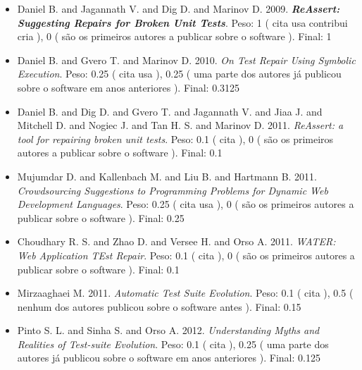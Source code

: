 \begin{itemize}
\item Daniel B. and Jagannath V. and Dig D. and Marinov D.
      2009.
        \textbf{\textit{ ReAssert: Suggesting Repairs for Broken Unit Tests}}.
      Peso:
      1 (
          cita
          usa
          contribui
          cria
      ),
      0 (
são os primeiros autores a publicar sobre o software
      ).
      Final:
      1

\item Daniel B. and Gvero T. and Marinov D.
      2010.
        \textit{ On Test Repair Using Symbolic Execution}.
      Peso:
      0.25 (
          cita
          usa
      ),
      0.25 (
uma parte dos autores já publicou sobre o software em anos anteriores
      ).
      Final:
      0.3125

\item Daniel B. and Dig D. and Gvero T. and Jagannath V. and Jiaa J. and Mitchell D. and Nogiec J. and Tan H. S. and Marinov D.
      2011.
        \textit{ ReAssert: a tool for repairing broken unit tests}.
      Peso:
      0.1 (
          cita
      ),
      0 (
são os primeiros autores a publicar sobre o software
      ).
      Final:
      0.1

\item Mujumdar D. and Kallenbach M. and Liu B. and Hartmann B.
      2011.
        \textit{ Crowdsourcing Suggestions to Programming Problems for Dynamic Web Development Languages}.
      Peso:
      0.25 (
          cita
          usa
      ),
      0 (
são os primeiros autores a publicar sobre o software
      ).
      Final:
      0.25

\item Choudhary R. S. and Zhao D. and Versee H. and Orso A.
      2011.
        \textit{ WATER: Web Application TEst Repair}.
      Peso:
      0.1 (
          cita
      ),
      0 (
são os primeiros autores a publicar sobre o software
      ).
      Final:
      0.1

\item Mirzaaghaei M.
      2011.
        \textit{ Automatic Test Suite Evolution}.
      Peso:
      0.1 (
          cita
      ),
      0.5 (
nenhum dos autores publicou sobre o software antes
      ).
      Final:
      0.15

\item Pinto S. L. and Sinha S. and Orso A.
      2012.
        \textit{ Understanding Myths and Realities of Test-suite Evolution}.
      Peso:
      0.1 (
          cita
      ),
      0.25 (
uma parte dos autores já publicou sobre o software em anos anteriores
      ).
      Final:
      0.125


\end{itemize}
